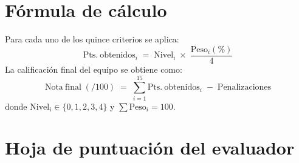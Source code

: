 \documentclass[11pt,a4paper]{article}
\begin{document}
\section{F\'ormula de c\'alculo}

Para cada uno de los quince criterios se aplica:
\begin{equation}
    \mathrm{Pts.\ obtenidos}_i \;=\; \mathrm{Nivel}_i \;\times\; \frac{\mathrm{Peso}_i(\%)}{4}
\end{equation}
La calificaci\'on final del equipo se obtiene como:
\begin{equation}
    \mathrm{Nota\ final}\;(/100) \;=\; \sum_{i=1}^{15} \mathrm{Pts.\ obtenidos}_i \;-\; \mathrm{Penalizaciones}
\end{equation}
donde $\mathrm{Nivel}_i \in \{0,1,2,3,4\}$ y $\sum \mathrm{Peso}_i = 100$.

\section{Hoja de puntuaci\'on del evaluador}
\end{document}
